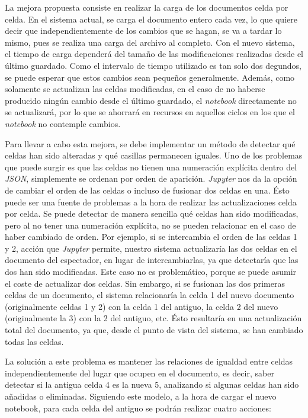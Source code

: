 \documentclass[11pt,spanish,listoffigures]{tfgetsinf}
\begin{document}
La mejora propuesta consiste en realizar la carga de los documentos celda por celda. En el sistema actual, se carga el documento entero cada vez, lo que quiere decir que independientemente de los cambios que se hagan, se va a tardar lo mismo, pues se realiza una carga del archivo al completo. Con el nuevo sistema, el tiempo de carga dependerá del tamaño de las modificaciones realizadas desde el último guardado. Como el intervalo de tiempo utilizado es tan solo dos degundos, se puede esperar que estos cambios sean pequeños generalmente. Además, como solamente se actualizan las celdas modificadas, en el caso de no haberse producido ningún cambio desde el último guardado, el \textit{notebook} directamente no se actualizará, por lo que se ahorrará en recursos en aquellos  ciclos en los que el \textit{notebook} no contemple cambios.

Para llevar a cabo esta mejora, se debe implementar un método de detectar qué celdas han sido alteradas y qué casillas permanecen iguales. Uno de los problemas que puede surgir es que las celdas no tienen una numeración explícita dentro del \textit{JSON}, simplemente se ordenan por orden de aparición. \textit{Jupyter} nos da la opción de cambiar el orden de las celdas o incluso de fusionar dos celdas en una. Ésto puede ser una fuente de problemas a la hora de realizar las actualizaciones celda por celda. Se puede detectar de manera sencilla qué celdas han sido modificadas, pero al no tener una numeración explícita, no se pueden relacionar en el caso de haber cambiado de orden. Por ejemplo, si se intercambia el orden de las celdas 1 y 2, acción que \textit{Jupyter} permite, nuestro sistema actualizaría las dos celdas en el documento del espectador, en lugar de intercambiarlas, ya que detectaría que las dos han sido modificadas. Este caso no es problemático, porque se puede asumir el coste de actualizar dos celdas. Sin embargo, si se fusionan las dos primeras celdas de un documento, el sistema relacionaría la celda 1 del nuevo documento (originalmente celdas 1 y 2) con la celda 1 del antiguo, la celda 2 del nuevo (originalmente la 3) con la 2 del antiguo, etc. Ésto resultaría en una actualización total del documento, ya que, desde el punto de vista del sistema, se han cambiado todas las celdas. 

La solución a este problema es mantener las relaciones de igualdad entre celdas independientemente del lugar que ocupen en el documento, es decir, saber detectar si la antigua celda 4 es la nueva 5, analizando si algunas celdas han sido añadidas o eliminadas. Siguiendo este modelo, a la hora de cargar el nuevo notebook, para cada celda del antiguo se podrán realizar cuatro acciones:
\end{document}
